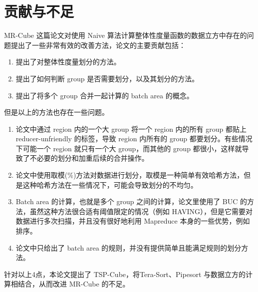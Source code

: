 \section{贡献与不足}

MR-Cube \cite{nandi2011distributed} 这篇论文对使用 Naive 算法计算整体性度量函数的数据立方中存在的问题提出了一些非常有效的改善方法，论文的主要贡献包括：

\begin{enumerate}
\item 提出了对整体性度量划分的方法。
\item 提出了如何判断 group 是否需要划分，以及其划分的方法。
\item 提出了将多个 group 合并一起计算的 batch area 的概念。
\end{enumerate}

但是以上的方法也存在一些问题。

\begin{enumerate}
\item 论文中通过 region 内的一个大 group 将一个 region 内的所有 group 都贴上 reducer-unfriendly 的标签，导致 region 内所有的 group 都要划分。有些情况下可能一个 region 就只有一个大 group，而其他的 group 都很小，这样就导致了不必要的划分和加重后续的合并操作。
\item 论文中使用取模(\%)方法对数据进行划分，取模是一种简单有效哈希方法，但是这种哈希方法在一些情况下，可能会导致划分的不均匀。
\item Batch area 的计算，也就是多个 group 之间的计算，论文里使用了 BUC 的方法，虽然这种方法很合适有阈值限定的情况（例如 HAVING），但是它需要对数据进行多次扫描，并且没有很好地利用 Mapreduce 本身的一些优势，例如排序。
\item 论文中只给出了 batch area 的规则，并没有提供简单且能满足规则的划分方法。
\end{enumerate}

针对以上4点，本论文提出了 TSP-Cube，将Tera-Sort、Pipesort 与数据立方的计算相结合，从而改进 MR-Cube 的不足。





